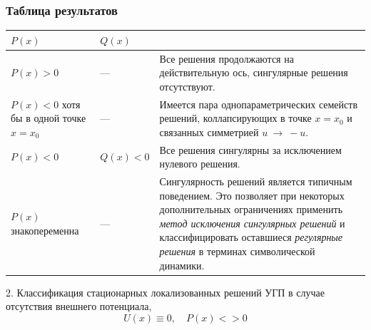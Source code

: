\documentclass [10pt] {beamer}
\begin{document}
\begin{frame}
	\frametitle{Таблица результатов}
	
	\begin{table}
		\begin{tabular}{ | m{70pt} | l || m{190pt} | }
			\hline
			$P(x)$ & $Q(x)$ & \\
			\hline
			$P(x) > 0$ & --- & Все решения продолжаются на действительную ось, сингулярные решения отсутствуют. \\
			\hline
			$P(x) < 0$ хотя бы в одной точке $x = x_0$ & --- & Имеется пара однопараметрических семейств решений, коллапсирующих в точке $x = x_0$ и связанных симметрией $u~\to~-u$. \\
			\hline
			$P(x) < 0$ & $Q(x) < 0$ & Все решения сингулярны за исключением нулевого решения. \\
			\hline
			$P(x)$ знакопеременна & --- & {\color{ceruleanblue} Сингулярность решений является типичным поведением}. Это позволяет при некоторых дополнительных ограничениях применить {\it метод исключения сингулярных решений} и {\color{ceruleanblue} классифицировать} оставшиеся {\it регулярные решения} в терминах символической динамики. \\
			\hline
		\end{tabular}
	\end{table}

\end{frame}


\begin{frame}
	\begin{center}
		{\LARGE 2. Классификация стационарных локализованных решений УГП в случае отсутствия внешнего потенциала, $$U(x) \equiv 0, \quad P(x) <> 0$$}
	\end{center}
\end{frame}
\end{document}

